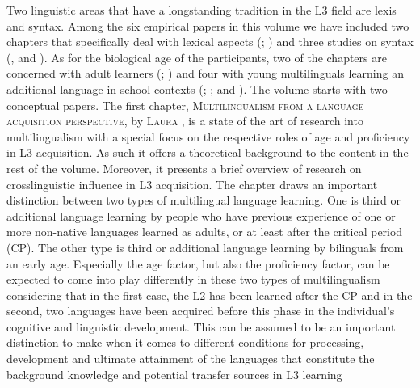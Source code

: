 \documentclass[output=paper,colorlinks,citecolor=brown,nonflat]{langsci/langscibook}
\begin{document}
Two linguistic areas that have a longstanding tradition in the L3 field are lexis and syntax. Among the six empirical papers in this volume we have included two chapters that specifically deal with lexical aspects (\citeauthor{chapters/gudmundson}; \citeauthor{chapters/munoz}) and three studies on syntax (\citeauthor{chapters/sanchez7}, \citeauthor{chapters/sciutti} and \citeauthor{chapters/stadt}). As for the biological age of the participants, two of the chapters are concerned with adult learners (\citeauthor{chapters/gudmundson}; \citeauthor{chapters/sciutti}) and four with young multilinguals learning an additional language in school contexts (\citeauthor{chapters/munoz}; \citeauthor{chapters/pfenninger}; \citeauthor{chapters/sanchez7} and \citeauthor{chapters/stadt}). The volume starts with two conceptual papers. The first chapter, \textsc{Multilingualism from a language acquisition perspective}, by \textsc{Laura \citeauthor{chapters/sanchez1},} is a state of the art of research into multilingualism with a special focus on the respective roles of age and proficiency in L3 acquisition. As such it offers a theoretical background to the content in the rest of the volume. Moreover, it presents a brief overview of research on crosslinguistic influence in L3 acquisition. The chapter draws an important distinction between two types of multilingual language learning. One is third or additional language learning by people who have previous experience of one or more non-native languages learned as adults, or at least after the critical period (CP). The other type is third or additional language learning by bilinguals from an early age. Especially the age factor, but also the proficiency factor, can be expected to come into play differently in these two types of multilingualism considering that in the first case, the L2 has been learned after the CP and in the second, two languages have been acquired before this phase in the individual’s cognitive and linguistic development. This can be assumed to be an important distinction to make when it comes to different conditions for processing, development and ultimate attainment of the languages that constitute the background knowledge and potential transfer sources in L3 learning
\end{document}
